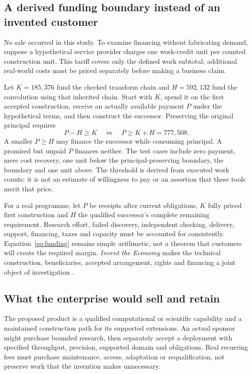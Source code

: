 \documentclass[11pt,letterpaper]{article}
\theoremstyle{definition}\newtheorem{definition}[theorem]{Definition}
\theoremstyle{remark}\newtheorem{remark}[theorem]{Remark}
\begin{document}
\subsection{A derived funding boundary instead of an invented customer}
No sale occurred in this study. To examine financing without fabricating demand, suppose a hypothetical service provider charges one work-credit unit per counted construction unit. This tariff covers only the defined work subtotal; additional real-world costs must be priced separately before making a business claim.

Let $K=185{,}376$ fund the checked transform chain and $H=592{,}132$ fund the convolution using that inherited chain. Start with $K$, spend it on the first accepted construction, receive an actually available payment $P$ under the hypothetical terms, and then construct the successor. Preserving the original principal requires
\begin{equation}
 P-H\ge K\quad\Longleftrightarrow\quad P\ge K+H=777{,}508.
 \label{eq:funding}
\end{equation}
A smaller $P\ge H$ may finance the successor while consuming principal. A promised but unpaid $P$ finances neither. The test cases include zero payment, mere cost recovery, one unit below the principal-preserving boundary, the boundary and one unit above. The threshold is derived from executed work counts; it is not an estimate of willingness to pay or an assertion that these tools merit that price.

For a real programme, let $P$ be receipts after current obligations, $K$ fully priced first construction and $H$ the qualified successor's complete remaining requirement. Research effort, failed discovery, independent checking, delivery, support, financing, taxes and capacity must be accounted for consistently. Equation~\eqref{eq:funding} remains simple arithmetic, not a theorem that customers will create the required margin. \emph{Invent the Economy} makes the technical construction, beneficiaries, accepted arrangement, rights and financing a joint object of investigation \cite{economy}.

\subsection{What the enterprise would sell and retain}
The proposed product is a qualified computational or scientific capability and a maintained construction path for its supported extensions. An actual sponsor might purchase bounded research, then separately accept a deployment with specified throughput, precision, supported domain and obligations. Real recurring fees must purchase maintenance, access, adaptation or requalification, not preserve work that the invention makes unnecessary.
\end{document}
